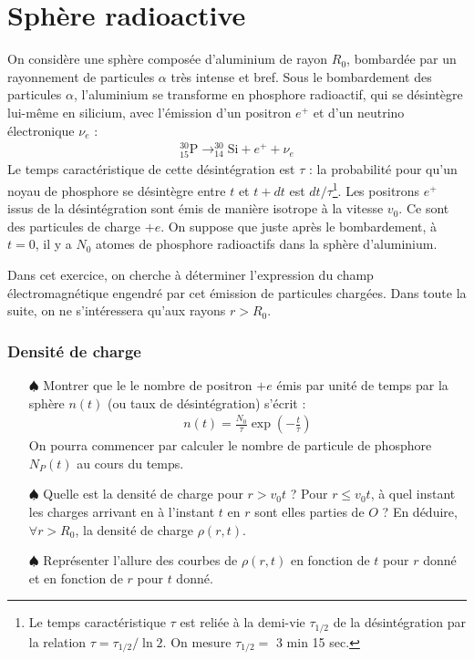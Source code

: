 \documentclass{report}
\begin{document}
\section*{Sphère radioactive}

On considère une sphère composée d'aluminium de rayon $R_0$, bombardée par un rayonnement de particules $\alpha$ très intense et bref. Sous le bombardement des particules $\alpha$, l'aluminium se transforme en phosphore radioactif, qui se désintègre lui-même en silicium, avec l'émission d'un positron $e^+$ et d'un neutrino électronique $\nu_e$ :
\begin{align*}
	^{30}_{15}\mathrm{P}\longrightarrow^{30}_{14}\mathrm{Si}+e^++\nu_e
\end{align*}
Le temps caractéristique de cette désintégration est $\tau$ : la probabilité pour qu'un noyau de phosphore se désintègre entre $t$ et $t+dt$ est $dt/\tau$\footnote{Le temps caractéristique $\tau$ est reliée à la demi-vie $\tau_{1/2}$ de la désintégration par la relation $\tau=\tau_{1/2}/\ln2$. On mesure $\tau_{1/2}=$ 3 min 15 sec.}. Les positrons $e^+$ issus de la désintégration sont émis de manière isotrope à la vitesse $v_0$. Ce sont des particules de charge $+e$.
On suppose que juste après le bombardement, à $t=0$, il y a $N_0$ atomes de phosphore radioactifs dans la sphère d'aluminium.

Dans cet exercice, on cherche à déterminer l'expression du champ électromagnétique engendré par cet émission de particules chargées. Dans toute la suite, on ne s'intéressera qu'aux rayons $r>R_0$.

\subsubsection*{Densité de charge}

\begin{itemize}

	\item[$\spadesuit$] Montrer que le le nombre de positron $+e$ émis par unité de temps par la sphère $n(t)$ (ou taux de désintégration) s'écrit : 
\begin{align*}
	n(t)=\frac{N_0}{\tau}\exp\left( -\frac{t}{\tau}\right) 
\end{align*}
On pourra commencer par calculer le nombre de particule de phosphore $N_P(t)$ au cours du temps. 
	
	\item[$\spadesuit$] Quelle est la densité de charge pour $r>v_0t$ ? Pour $r\leq v_0t$, à quel instant les charges arrivant en à l'instant $t$ en $r$ sont elles parties de $O$ ? En déduire, $\forall r>R_0$, la densité de charge $\rho(r,t)$.
	
	\item[$\spadesuit$] Représenter l'allure des courbes de $\rho(r,t)$ en fonction de $t$ pour $r$ donné et en fonction de $r$ pour $t$ donné.
	
\end{itemize}
\end{document}
